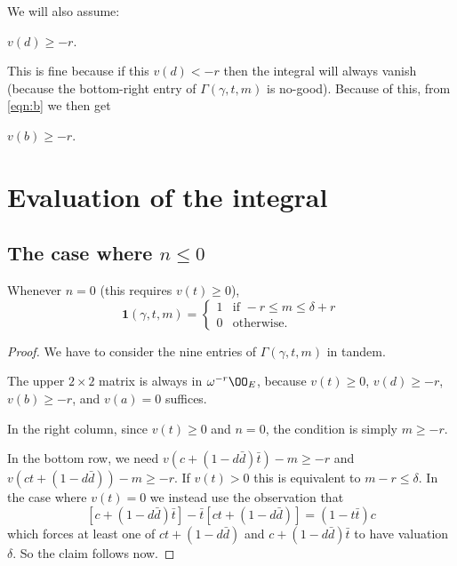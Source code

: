 We will also assume:
\begin{assume}
  $v(d) \geq -r$.
\end{assume}
This is fine because if this $v(d) < -r$ then the integral will always vanish
(because the bottom-right entry of $\Gamma(\gamma, t, m)$ is no-good).
Because of this, from \eqref{eqn:b} we then get
\begin{corollary}
  $v(b) \geq -r$.
\end{corollary}

\section{Evaluation of the integral}
\subsection{The case where $n \leq 0$}
\begin{claim}
  Whenever $n = 0$ (this requires $v(t) \geq 0$),
  \[
    \mathbf{1}(\gamma, t, m) =
    \begin{cases}
      1 & \text{if } -r \le m \le \delta+r \\
      0 & \text{otherwise.}
    \end{cases}
  \]
\end{claim}
\begin{proof}
  We have to consider the nine entries of $\Gamma(\gamma, t, m)$ in tandem.

  The upper $2 \times 2$ matrix is always in $\omega^{-r}\OO_E$,
  because $v(t) \geq 0$, $v(d) \geq -r$, $v(b) \geq -r$, and $v(a) = 0$ suffices.

  In the right column, since $v(t) \geq 0$ and $n = 0$, the condition is simply $m \ge -r$.

  In the bottom row, we need
  $v\left( c+(1-d\bar d) \bar t \right)-m \geq -r$
  and $v\left( ct +(1-d\bar d) \right)-m \geq -r$.
  If $v(t) > 0$ this is equivalent to $m-r \leq \delta$.
  In the case where $v(t) = 0$ we instead use the observation that
  \begin{equation}
    \left[ c + (1-d \bar d) \bar t \right]
    - \bar t \left[ ct + (1-d \bar d) \right] = (1-t\bar t) c
    \label{eqn:ctrick}
  \end{equation}
  which forces at least one of $ct + (1-d \bar d)$ and $c + (1-d \bar d) \bar t$ to
  have valuation $\delta$. So the claim follows now.
\end{proof}

